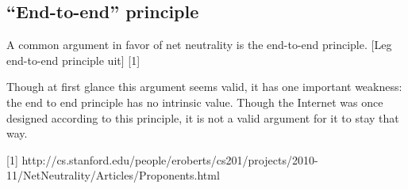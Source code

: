 
\subsection{``End-to-end'' principle}
A common argument in favor of net neutrality is the end-to-end principle. [Leg end-to-end principle uit] [1]

Though at first glance this argument seems valid, it has one important weakness: the end to end principle has no intrinsic value. Though the Internet was once designed according to this principle, it is not a valid argument for it to stay that way.



[1] http://cs.stanford.edu/people/eroberts/cs201/projects/2010-11/NetNeutrality/Articles/Proponents.html